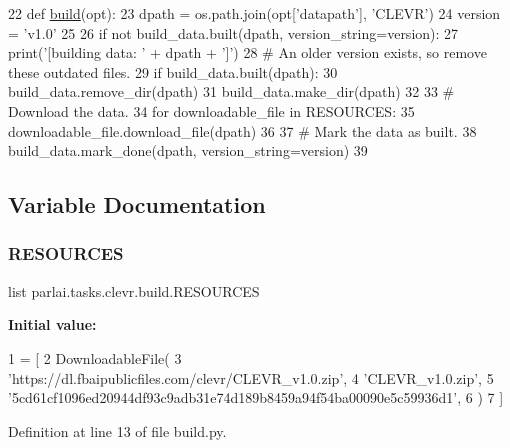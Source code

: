 \begin{DoxyCode}
22 \textcolor{keyword}{def }\hyperlink{namespacedialog__babi__feedback_1_1build_a7a9d289f7493a5ded13c4b7f071b6184}{build}(opt):
23     dpath = os.path.join(opt[\textcolor{stringliteral}{'datapath'}], \textcolor{stringliteral}{'CLEVR'})
24     version = \textcolor{stringliteral}{'v1.0'}
25 
26     \textcolor{keywordflow}{if} \textcolor{keywordflow}{not} build\_data.built(dpath, version\_string=version):
27         print(\textcolor{stringliteral}{'[building data: '} + dpath + \textcolor{stringliteral}{']'})
28         \textcolor{comment}{# An older version exists, so remove these outdated files.}
29         \textcolor{keywordflow}{if} build\_data.built(dpath):
30             build\_data.remove\_dir(dpath)
31         build\_data.make\_dir(dpath)
32 
33         \textcolor{comment}{# Download the data.}
34         \textcolor{keywordflow}{for} downloadable\_file \textcolor{keywordflow}{in} RESOURCES:
35             downloadable\_file.download\_file(dpath)
36 
37         \textcolor{comment}{# Mark the data as built.}
38         build\_data.mark\_done(dpath, version\_string=version)
39 \end{DoxyCode}


\subsection{Variable Documentation}
\mbox{\label{namespaceparlai_1_1tasks_1_1clevr_1_1build_a5fb1a9daed505a003a5cb86a140a3d5e}} 
\subsubsection{\texorpdfstring{R\+E\+S\+O\+U\+R\+C\+ES}{RESOURCES}}
{\footnotesize\ttfamily list parlai.\+tasks.\+clevr.\+build.\+R\+E\+S\+O\+U\+R\+C\+ES}

{\bfseries Initial value\+:}
\begin{DoxyCode}
1 =  [
2     DownloadableFile(
3         \textcolor{stringliteral}{'https://dl.fbaipublicfiles.com/clevr/CLEVR\_v1.0.zip'},
4         \textcolor{stringliteral}{'CLEVR\_v1.0.zip'},
5         \textcolor{stringliteral}{'5cd61cf1096ed20944df93c9adb31e74d189b8459a94f54ba00090e5c59936d1'},
6     )
7 ]
\end{DoxyCode}


Definition at line 13 of file build.\+py.

